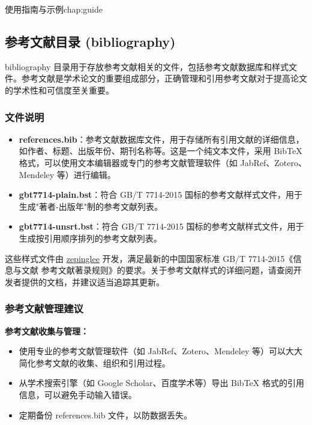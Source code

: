 \begin{cuzchapter}{使用指南与示例}{chap:guide}
    \subsection{参考文献目录 (bibliography)}\label{sub:bibliography}

    bibliography 目录用于存放参考文献相关的文件，包括参考文献数据库和样式文件。参考文献是学术论文的重要组成部分，正确管理和引用参考文献对于提高论文的学术性和可信度至关重要。

    \subsubsection{文件说明}\label{subsub:bibliography-files}

    \begin{itemize}
        \item \textbf{references.bib}：参考文献数据库文件，用于存储所有引用文献的详细信息，如作者、标题、出版年份、期刊名称等。这是一个纯文本文件，采用 BibTeX 格式，可以使用文本编辑器或专门的参考文献管理软件（如 JabRef、Zotero、Mendeley 等）进行编辑。

        \item \textbf{gbt7714-plain.bst}：符合 GB/T 7714-2015 国标的参考文献样式文件，用于生成"著者-出版年"制的参考文献列表。

        \item \textbf{gbt7714-unsrt.bst}：符合 GB/T 7714-2015 国标的参考文献样式文件，用于生成按引用顺序排列的参考文献列表。
    \end{itemize}

    这些样式文件由 \href{https://github.com/zepinglee/gbt7714-bibtex-style}{zepinglee} 开发，满足最新的中国国家标准 GB/T 7714-2015《信息与文献 参考文献著录规则》的要求。关于参考文献样式的详细问题，请查阅开发者提供的文档，并建议适当追踪其更新。

    \subsubsection{参考文献管理建议}\label{subsub:bibliography-management}

    \begin{leftbar}
        \noindent\textbf{参考文献收集与管理：}
        \begin{itemize}
            \item 使用专业的参考文献管理软件（如 JabRef、Zotero、Mendeley 等）可以大大简化参考文献的收集、组织和引用过程。
            \item 从学术搜索引擎（如 Google Scholar、百度学术等）导出 BibTeX 格式的引用信息，可以避免手动输入错误。
            \item 定期备份 references.bib 文件，以防数据丢失。
        \end{itemize}


\end{leftbar}
\end{cuzchapter}
